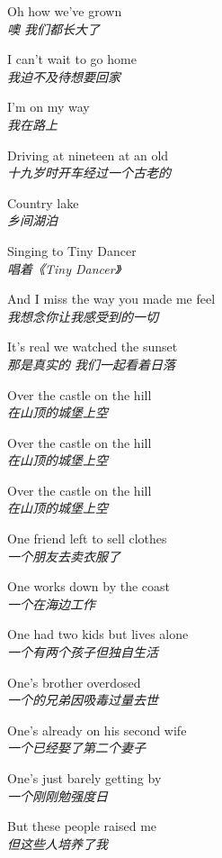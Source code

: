 \begin{spacing}{1.5}
\begin{flushleft}
Oh how we've grown\\
\textit{噢 我们都长大了}\lyricspace

I can't wait to go home\\
\textit{我迫不及待想要回家}\lyricspace

I'm on my way\\
\textit{我在路上}\lyricspace

Driving at nineteen at an old\\
\textit{十九岁时开车经过一个古老的}\lyricspace

Country lake\\
\textit{乡间湖泊}\lyricspace

Singing to Tiny Dancer\\
\textit{唱着《Tiny Dancer》}\lyricspace

And I miss the way you made me feel\\
\textit{我想念你让我感受到的一切}\lyricspace

It's real we watched the sunset\\
\textit{那是真实的 我们一起看着日落}\lyricspace

Over the castle on the hill\\
\textit{在山顶的城堡上空}\lyricspace

Over the castle on the hill\\
\textit{在山顶的城堡上空}\lyricspace

Over the castle on the hill\\
\textit{在山顶的城堡上空}\lyricspace

One friend left to sell clothes\\
\textit{一个朋友去卖衣服了}\lyricspace

One works down by the coast\\
\textit{一个在海边工作}\lyricspace

One had two kids but lives alone\\
\textit{一个有两个孩子但独自生活}\lyricspace

One's brother overdosed\\
\textit{一个的兄弟因吸毒过量去世}\lyricspace

One's already on his second wife\\
\textit{一个已经娶了第二个妻子}\lyricspace

One's just barely getting by\\
\textit{一个刚刚勉强度日}\lyricspace

But these people raised me\\
\textit{但这些人培养了我}\lyricspace


\end{flushleft}
\end{spacing}
